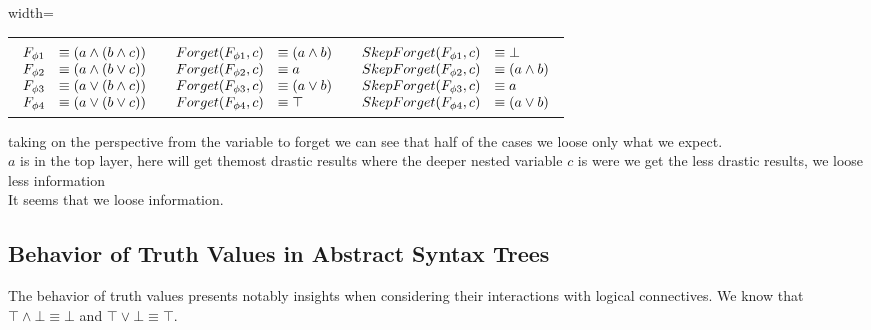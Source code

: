 \begin{adjustbox}{width=\textwidth}
\begin{tabular}{ c  c  c }
 &  &  \\
$\begin{array}{l l}
F_{\phi1} &\equiv (a \land (b \land c))\\
F_{\phi2} &\equiv (a \land (b \lor c))\\
F_{\phi3} &\equiv (a \lor (b \land c))\\
F_{\phi4} &\equiv (a \lor (b \lor c))\\
\end{array}$ & $\begin{array}{l l}
Forget(F_{\phi1},c) &\equiv (a \land b)\\
Forget(F_{\phi2},c) &\equiv a\\
Forget(F_{\phi3},c) &\equiv (a \lor b)\\
Forget(F_{\phi4},c) &\equiv \top\\
\end{array}$ & $\begin{array}{l l}
SkepForget(F_{\phi1},c) &\equiv \bot\\
SkepForget(F_{\phi2},c) &\equiv (a \land b)\\
SkepForget(F_{\phi3},c) &\equiv a\\
SkepForget(F_{\phi4},c) &\equiv (a \lor b)\\
\end{array}$\\
\end{tabular}
\end{adjustbox}\newline\newline
taking on the perspective from the variable to forget we can see that half of the cases we loose only what we expect.\\$a$ is in the top layer, here will get themost drastic results where the deeper nested variable $c$ is were we get the less drastic results, we loose less information\\It seems that we loose information.\subsection{Behavior of Truth Values in Abstract Syntax Trees}

                    The behavior of truth values presents notably insights when considering their interactions with logical connectives. 
                    We know that $\top \land \bot \equiv \bot$ and $\top \lor \bot \equiv \top$. 

